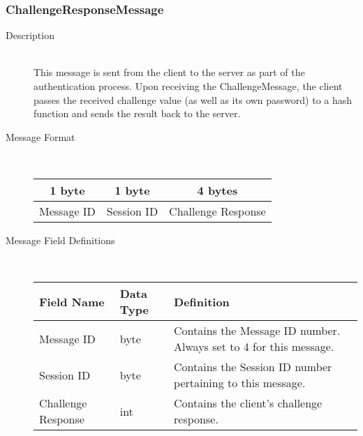 \documentclass[12pt,letterpaper,titlepage]{article}
\begin{document}
\subsubsection{ChallengeResponseMessage}
	\begin{description}
	\item[Description] \hfill \\
		This message is sent from the client to the server as part of the authentication process.  
		Upon receiving the ChallengeMessage, the client passes the received challenge value 
		(as well as its own password) to a hash function and sends the result back to the server.
	\item[Message Format] \hfill \\
	\begin{tabular}{ | c | c | c | }
		\hline
		1 byte & 1 byte & 4 bytes \\
		\hline
		Message ID & Session ID &  Challenge Response \\
		\hline
	\end{tabular}
	\item[Message Field Definitions] \hfill \\
	\begin{tabular}{ | p{3cm} | p{1cm} | p{8cm} | }
		\hline
		Field Name & Data Type & Definition \\
		\hline
		Message ID & byte & Contains the Message ID number. 
					\newline Always set to 4 for this message. \\
		\hline
		Session ID & byte & Contains the Session ID number pertaining to this message. \\
		\hline
		Challenge Response & int & Contains the client's challenge response. \\
		\hline
	\end{tabular}
	\end{description}
\end{document}
